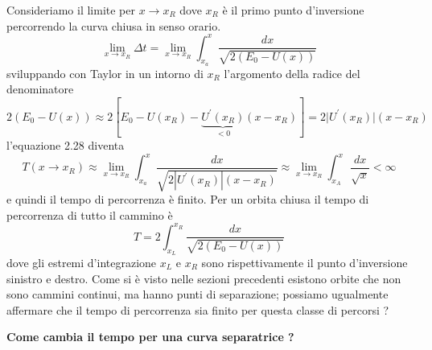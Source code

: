 \noindent Consideriamo il limite per $x \rightarrow x_R$ dove $x_R$ \`{e} il primo punto d'inversione percorrendo la curva chiusa in senso orario.
\begin{equation}
	\lim_{x \rightarrow x_R} \Delta t = \lim_{x \rightarrow x_R} \int_{x_a}^{x} \frac{dx}{\sqrt{2(E_0 -U(x))}} 
\end{equation}
sviluppando con Taylor in un intorno di $x_R$ l'argomento della radice del denominatore 
\begin{equation*}
	2(E_0 -U(x)) \approx 2   [ E_0 - U(x_R) -\underbrace{U^{\prime}(x_R)}_{<  0}(x-x_R) ] = 2 \vert U^{\prime}(x_R)\vert (x-x_R)
\end{equation*}
l'equazione 2.28 diventa
\begin{equation*}
	T(x \rightarrow x_R) \approx \lim_{x \rightarrow x_R} \int_{x_a}^{x} \frac{dx}{\sqrt{2|U^{\prime}(x_R)| (x-x_R)}} \approx \lim_{x \rightarrow x_R} \int_{x_A}^{x} \frac{dx}{\sqrt{x}} < \infty 
\end{equation*} 
e quindi il tempo di percorrenza \`{e} finito.
Per un orbita chiusa il tempo di percorrenza di tutto il cammino \`{e}
\begin{equation}
	T = 2 \int_{x_L}^{x_R} \frac{dx}{\sqrt{2(E_0 -U(x))}}
\end{equation} 
dove gli estremi d'integrazione $x_L$ e $x_R$ sono rispettivamente il punto d'inversione sinistro e destro.
Come si \`{e} visto nelle sezioni precedenti esistono orbite che non sono cammini continui, ma hanno punti di separazione; possiamo ugualmente affermare che il tempo di percorrenza sia finito per questa classe di percorsi ?
\newpage 

\noindent \textbf{Come cambia il tempo per una curva separatrice ?}

